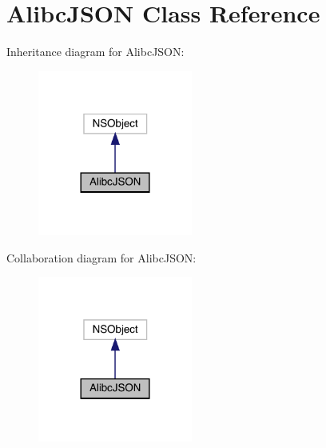 \hypertarget{interface_alibc_j_s_o_n}{}\section{Alibc\+J\+S\+ON Class Reference}
\label{interface_alibc_j_s_o_n}


Inheritance diagram for Alibc\+J\+S\+ON\+:\nopagebreak
\begin{figure}[H]
\begin{center}
\leavevmode
\includegraphics[width=144pt]{interface_alibc_j_s_o_n__inherit__graph}
\end{center}
\end{figure}


Collaboration diagram for Alibc\+J\+S\+ON\+:\nopagebreak
\begin{figure}[H]
\begin{center}
\leavevmode
\includegraphics[width=144pt]{interface_alibc_j_s_o_n__coll__graph}
\end{center}
\end{figure}
